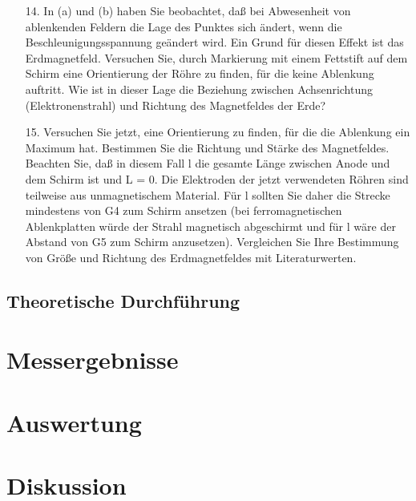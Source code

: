 \documentclass[12pt]{scrartcl}
\begin{document}
\begin{itemize}
\begin{enumerate}
\item[14.]
In (a) und (b) haben Sie beobachtet, daß bei Abwesenheit von ablenkenden Feldern die Lage des Punktes sich ändert, wenn die Beschleunigungsspannung geändert wird. Ein Grund für diesen Effekt ist das Erdmagnetfeld. Versuchen Sie, durch Markierung mit einem Fettstift auf dem Schirm eine Orientierung der Röhre zu finden, für die keine Ablenkung auftritt. Wie ist in dieser Lage die Beziehung zwischen Achsenrichtung (Elektronenstrahl) und Richtung des Magnetfeldes der Erde?
\item[15.]
Versuchen Sie jetzt, eine Orientierung zu finden, für die die Ablenkung ein Maximum hat. Bestimmen Sie die Richtung und Stärke des Magnetfeldes. Beachten Sie, daß in diesem Fall l die gesamte Länge zwischen Anode und dem Schirm ist und L = 0. Die Elektroden der jetzt verwendeten Röhren sind teilweise aus unmagnetischem Material. Für l
sollten Sie daher die Strecke mindestens von G4 zum Schirm
ansetzen (bei ferromagnetischen Ablenkplatten würde der Strahl magnetisch abgeschirmt und für l wäre der Abstand von G5 zum Schirm anzusetzen). Vergleichen Sie Ihre Bestimmung von Größe und Richtung des Erdmagnetfeldes mit Literaturwerten.
\end{enumerate}

\end{itemize}

\subsection{Theoretische Durchführung}


\section{Messergebnisse}



\section{Auswertung}


\section{Diskussion}


\end{document}
